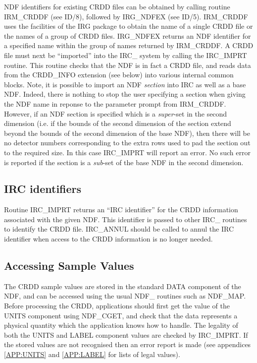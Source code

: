 NDF identifiers for existing CRDD files can be obtained by calling routine
IRM\_CRDDF (see ID/8), followed by IRG\_NDFEX (see ID/5). IRM\_CRDDF uses the
facilities of the IRG package to obtain the name of a single CRDD file or the
names of a group of CRDD files. IRG\_NDFEX returns an NDF identifier for a
specified name within the group of names returned by IRM\_CRDDF. A CRDD file
must next be ``imported'' into the IRC\_ system by calling the IRC\_IMPRT
routine. This routine checks that the NDF is in fact a CRDD file, and reads data
from the CRDD\_INFO extension (see below) into various internal common blocks.
Note, it is possible to import an NDF {\em section} into IRC as well as a base
NDF. Indeed, there is nothing to stop the user specifying a section when giving
the NDF name in reponse to the parameter prompt from IRM\_CRDDF. However, if 
an NDF section is specified which is a {\em super}-set in the second dimension 
(i.e. if the bounds of the second dimension of the section extend beyond the 
bounds of the second dimension of the base NDF), then there will be no 
detector numbers corresponding to the extra rows used to pad the section out to 
the required size. In this case IRC\_IMPRT will report an error. No such error 
is reported if the section is a {\em sub}-set of the base NDF in the second 
dimension.

\subsection{IRC identifiers}
Routine IRC\_IMPRT returns an ``IRC identifier'' for the CRDD information 
associated with the given NDF. This identifier is passed to other IRC\_ routines 
to identify the CRDD file. IRC\_ANNUL should be called to annul the IRC 
identifier when access to the CRDD information is no longer needed.

\subsection {Accessing Sample Values}
The CRDD sample values are stored in the standard DATA component of the NDF, and 
can be accessed using the usual NDF\_ routines such as NDF\_MAP. Before 
processing the CRDD, applications should first get the value of the UNITS 
component using NDF\_CGET, and check that the data represents a physical 
quantity which the application knows how to handle. The legality of both the
UNITS and LABEL component values are checked by IRC\_IMPRT. If the stored values
are not recognised then an error report is made (see appendices 
\ref {APP:UNITS} and \ref {APP:LABEL} for lists of legal values).

